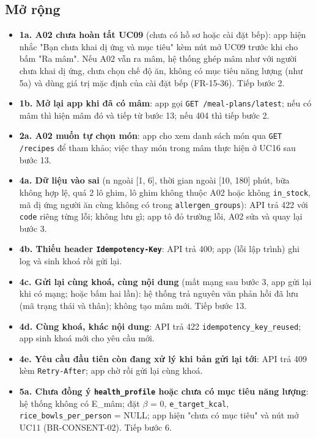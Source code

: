 \subsection{Mở rộng}
\begin{itemize}
\item \textbf{1a. A02 chưa hoàn tất UC09} (chưa có hồ sơ hoặc cài đặt bếp): app hiện nhắc "Bạn chưa khai dị ứng và mục tiêu" kèm nút mở UC09 trước khi cho bấm "Ra mâm". Nếu A02 vẫn ra mâm, hệ thống ghép mâm như với người chưa khai dị ứng, chưa chọn chế độ ăn, không có mục tiêu năng lượng (như 5a) và dùng giá trị mặc định của cài đặt bếp (FR-\allowbreak{}15-\allowbreak{}36). Tiếp bước 2.
\item \textbf{1b. Mở lại app khi đã có mâm}: app gọi {\small\texttt{GET /\allowbreak{}\allowbreak{}meal-\allowbreak{}plans/\allowbreak{}\allowbreak{}latest}}; nếu có mâm thì hiện mâm đó và tiếp từ bước 13; nếu 404 thì tiếp bước 2.
\item \textbf{2a. A02 muốn tự chọn món}: app cho xem danh sách món qua {\small\texttt{GET /\allowbreak{}\allowbreak{}recipes}} để tham khảo; việc thay món trong mâm thực hiện ở UC16 sau bước 13.
\item \textbf{4a. Dữ liệu vào sai} (n ngoài [1, 6], thời gian ngoài [10, 180] phút, bữa không hợp lệ, quá 2 lô ghim, lô ghim không thuộc A02 hoặc không {\small\texttt{in\_\allowbreak{}\allowbreak{}stock}}, mã dị ứng người ăn cùng không có trong {\small\texttt{allergen\_\allowbreak{}\allowbreak{}groups}}): API trả 422 với {\small\texttt{code}} riêng từng lỗi; không lưu gì; app tô đỏ trường lỗi, A02 sửa và quay lại bước 3.
\item \textbf{4b. Thiếu header {\small\texttt{Idempotency-\allowbreak{}Key}}}: API trả 400; app (lỗi lập trình) ghi log và sinh khoá rồi gửi lại.
\item \textbf{4c. Gửi lại cùng khoá, cùng nội dung} (mất mạng sau bước 3, app gửi lại khi có mạng; hoặc bấm hai lần): hệ thống trả nguyên văn phản hồi đã lưu (mã trạng thái và thân); không tạo mâm mới. Tiếp bước 13.
\item \textbf{4d. Cùng khoá, khác nội dung}: API trả 422 {\small\texttt{idempotency\_\allowbreak{}\allowbreak{}key\_\allowbreak{}\allowbreak{}reused}}; app sinh khoá mới cho yêu cầu mới.
\item \textbf{4e. Yêu cầu đầu tiên còn đang xử lý khi bản gửi lại tới}: API trả 409 kèm {\small\texttt{Retry-\allowbreak{}After}}; app chờ rồi gửi lại cùng khoá.
\item \textbf{5a. Chưa đồng ý {\small\texttt{health\_\allowbreak{}\allowbreak{}profile}} hoặc chưa có mục tiêu năng lượng}: hệ thống không có E\_\allowbreak{}mâm; đặt \ensuremath{\beta} = 0, {\small\texttt{e\_\allowbreak{}\allowbreak{}target\_\allowbreak{}\allowbreak{}kcal}}, {\small\texttt{rice\_\allowbreak{}\allowbreak{}bowls\_\allowbreak{}\allowbreak{}per\_\allowbreak{}\allowbreak{}person}} = NULL; app hiện "chưa có mục tiêu" và nút mở UC11 (BR-\allowbreak{}CONSENT-\allowbreak{}02). Tiếp bước 6.

\end{itemize}
